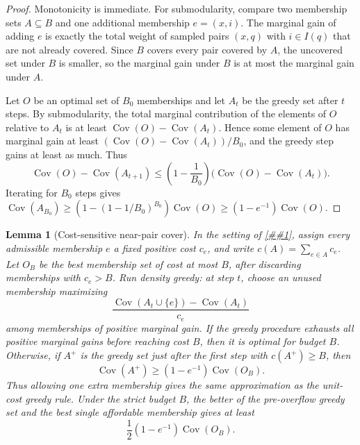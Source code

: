\documentclass[10pt]{article}
\newcommand{\cref}[1]{\ref{##1}}
\newtheorem{lemma}[theorem]{Lemma}
\theoremstyle{definition}
\begin{document}
\begin{proof}
   Monotonicity is immediate. For submodularity, compare two membership sets
   $A\subseteq B$ and one additional membership $e=(x,i)$. The marginal gain of
   adding $e$ is exactly the total weight of sampled pairs $(x,q)$ with
   $i\in I(q)$ that are not already covered. Since $B$ covers every pair covered
   by $A$, the uncovered set under $B$ is smaller, so the marginal gain under
   $B$ is at most the marginal gain under $A$.

   Let $O$ be an optimal set of $B_0$ memberships and let $A_t$ be the greedy
   set after $t$ steps. By submodularity, the total marginal contribution of the
   elements of $O$ relative to $A_t$ is at least
   $\operatorname{Cov}(O)-\operatorname{Cov}(A_t)$. Hence some element of $O$
   has marginal gain at least
   $(\operatorname{Cov}(O)-\operatorname{Cov}(A_t))/B_0$, and the greedy step
   gains at least as much. Thus
   \[
      \operatorname{Cov}(O)-\operatorname{Cov}(A_{t+1})
      \le
      \left(1-\frac1{B_0}\right)
      \bigl(\operatorname{Cov}(O)-\operatorname{Cov}(A_t)\bigr).
   \]
   Iterating for $B_0$ steps gives
   $\operatorname{Cov}(A_{B_0})\ge(1-(1-1/B_0)^{B_0})\operatorname{Cov}(O)
   \ge(1-e^{-1})\operatorname{Cov}(O)$.
\end{proof}

\begin{lemma}[Cost-sensitive near-pair cover]\label{lem:cost-sensitive-near-pair-cover}
   In the setting of \cref{lem:greedy-near-pair-cover}, assign every admissible
   membership $e$ a fixed positive cost $c_e$, and write
   $c(A)=\sum_{e\in A}c_e$. Let $O_B$ be the best membership set of cost at most
   $B$, after discarding memberships with $c_e>B$. Run density greedy: at step
   $t$, choose an unused membership maximizing
   \[
      \frac{\operatorname{Cov}(A_t\cup\{e\})-\operatorname{Cov}(A_t)}{c_e}
   \]
   among memberships of positive marginal gain. If the greedy procedure exhausts
   all positive marginal gains before reaching cost $B$, then it is optimal for
   budget $B$. Otherwise, if $A^+$ is the greedy set just after the first step
   with $c(A^+)\ge B$, then
   \[
      \operatorname{Cov}(A^+)\ge (1-e^{-1})\operatorname{Cov}(O_B).
   \]
   Thus allowing one extra membership gives the same approximation as the
   unit-cost greedy rule. Under the strict budget $B$, the better of the
   pre-overflow greedy set and the best single affordable membership gives at
   least
   \[
      \frac12(1-e^{-1})\operatorname{Cov}(O_B).
   \]
\end{lemma}
\end{document}
